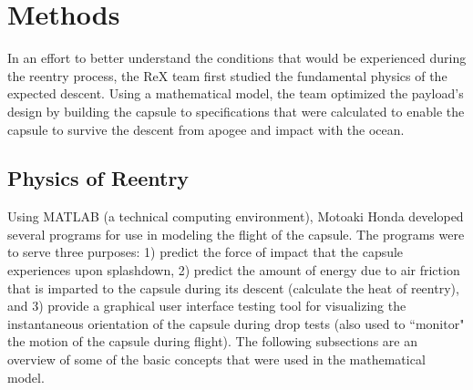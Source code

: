 \documentclass{article}
\begin{document}
\section{Methods}
	\begin{doublespace}
	\indent\indent In an effort to better understand the conditions that would be experienced during the reentry process, the ReX team first studied the fundamental physics of the expected descent. Using a mathematical model, the team optimized the payload's design by building the capsule to specifications that were calculated to enable the capsule to survive the descent from apogee and impact with the ocean.
	\subsection{Physics of Reentry}
	\indent\indent Using MATLAB (a technical computing environment), Motoaki Honda developed several programs for use in modeling the flight of the capsule. The programs were to serve three purposes: 1) predict the force of impact that the capsule experiences upon splashdown, 2) predict the amount of energy due to air friction that is imparted to the capsule during its descent (calculate the heat of reentry), and 3) provide a graphical user interface testing tool for visualizing the instantaneous orientation of the capsule during drop tests (also used to ``monitor" the motion of the capsule during flight). The following subsections are an overview of some of the basic concepts that were used in the mathematical model.

\end{doublespace}
\end{document}
